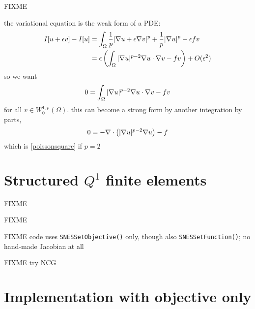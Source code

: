 \begin{marginfigure}
\medskip
\caption{FIXME}
\label{fig:of:cartoonfunctional}
\end{marginfigure}


the variational equation is the weak form of a PDE:
\begin{align*}
I[u+\epsilon v] - I[u] &= \int_\Omega \frac{1}{p} |\nabla u + \epsilon \nabla v|^p + \frac{1}{p} |\nabla u|^p - \epsilon f v \\
   &= \epsilon \left(\int_\Omega |\nabla u|^{p-2} \nabla u \cdot \nabla v - f v\right) + O(\epsilon^2)
\end{align*}
so we want
    $$0 = \int_\Omega |\nabla u|^{p-2} \nabla u \cdot \nabla v - f v$$
for all $v \in W^{1,p}_0(\Omega)$.  this can become a strong form by another integration by parts,
    $$0 = - \nabla\cdot\left(|\nabla u|^{p-2} \nabla u\right) - f$$
which is \eqref{poissonsquare} if $p=2$

\section{Structured $Q^1$ finite elements}

FIXME

\begin{marginfigure}

\caption{FIXME}
\label{fig:q1hat}
\end{marginfigure}

FIXME code uses \texttt{SNESSetObjective()} only, though also \texttt{SNESSetFunction()}; no hand-made Jacobian at all

FIXME try NCG

\section{Implementation with objective only}



